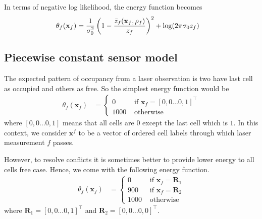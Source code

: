\documentclass[letterpaper, 10 pt, conference]{ieeeconf} %
\newcommand{\vect}[1]{\mathbf{#1}}
\begin{document}
In terms of negative log likelihood, the energy function becomes
\begin{align}
  \theta_f(\vect{x}_f) &= \frac{1}{\sigma_0^2}\left(1 - \frac{\actz}{z_f}\right)^2 + \log(2\pi\sigma_0z_f)
\end{align}

\subsection{Piecewise constant sensor model}
The expected pattern of occupancy from a laser observation is two have last cell as occupied and others as free. So the simplest energy function would be 
\begin{align}
  \theta_f(\vect{x}_f) &= \begin{cases}
              0 & \text{ if } \vect{x}_f = [0, 0 \dots 0, 1]^\top\\
           1000 & \text{ otherwise}
  \end{cases}
\end{align}
where $[0, 0 \dots 0, 1]$ means that all cells are $0$ except the last cell which is $1$. In this context, we consider $\vect{x}^f$ to be a vector of ordered cell labels through which laser measurement $f$ passes.

However, to resolve conflicts it is sometimes better to provide lower energy to all cells free case. Hence, we come with the following energy function.
\begin{align}
  \theta_f(\vect{x}_f) &= \begin{cases}
                     0 & \text{ if } \vect{x}_f = \vect{R}_1\\
                   900 & \text{ if } \vect{x}_f = \vect{R}_2\\
                  1000 & \text{ otherwise}
  \end{cases}
  \label{eq:piecewiseconstant}
\end{align}
where $\vect{R}_1 = [0, 0 \dots 0, 1]^\top$ and $\vect{R}_2 = [0, 0 \dots 0, 0]^\top$.
\end{document}
